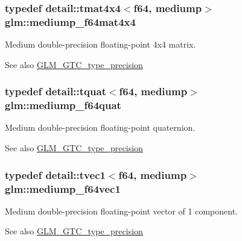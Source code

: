 \subsubsection[{\texorpdfstring{mediump\+\_\+f64mat4x4}{mediump_f64mat4x4}}]{\setlength{\rightskip}{0pt plus 5cm}typedef detail\+::tmat4x4$<$f64, mediump$>$ {\bf glm\+::mediump\+\_\+f64mat4x4}}\hypertarget{group__gtc__type__precision_ga941e42a0b337b5c8ad9c324aaa6b2ad5}{}\label{group__gtc__type__precision_ga941e42a0b337b5c8ad9c324aaa6b2ad5}
Medium double-\/precision floating-\/point 4x4 matrix. \begin{DoxySeeAlso}{See also}
\hyperlink{group__gtc__type__precision}{G\+L\+M\+\_\+\+G\+T\+C\+\_\+type\+\_\+precision} 
\end{DoxySeeAlso}
\subsubsection[{\texorpdfstring{mediump\+\_\+f64quat}{mediump_f64quat}}]{\setlength{\rightskip}{0pt plus 5cm}typedef detail\+::tquat$<$f64, mediump$>$ {\bf glm\+::mediump\+\_\+f64quat}}\hypertarget{group__gtc__type__precision_ga7cf626acf7f4fc29355c147bfe05163d}{}\label{group__gtc__type__precision_ga7cf626acf7f4fc29355c147bfe05163d}
Medium double-\/precision floating-\/point quaternion. \begin{DoxySeeAlso}{See also}
\hyperlink{group__gtc__type__precision}{G\+L\+M\+\_\+\+G\+T\+C\+\_\+type\+\_\+precision} 
\end{DoxySeeAlso}
\subsubsection[{\texorpdfstring{mediump\+\_\+f64vec1}{mediump_f64vec1}}]{\setlength{\rightskip}{0pt plus 5cm}typedef detail\+::tvec1$<$f64, mediump$>$ {\bf glm\+::mediump\+\_\+f64vec1}}\hypertarget{group__gtc__type__precision_ga1e3bbbd9ce5e215c4ba0980264b2711d}{}\label{group__gtc__type__precision_ga1e3bbbd9ce5e215c4ba0980264b2711d}
Medium double-\/precision floating-\/point vector of 1 component. \begin{DoxySeeAlso}{See also}
\hyperlink{group__gtc__type__precision}{G\+L\+M\+\_\+\+G\+T\+C\+\_\+type\+\_\+precision} 
\end{DoxySeeAlso}
